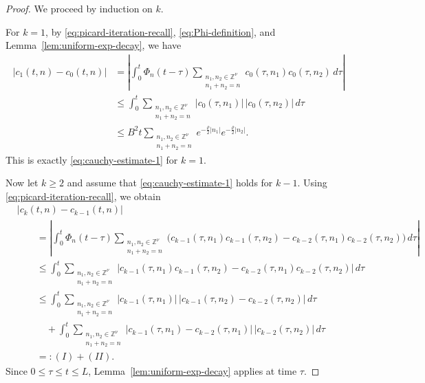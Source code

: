 \documentclass[12pt,reqno,tbtags]{amsart}
\newcommand\1{\mathbbm{1}}
\begin{document}
\begin{proof}
We proceed by induction on $k$.

For $k=1$, by \eqref{eq:picard-iteration-recall}, \eqref{eq:Phi-definition}, and
Lemma~\ref{lem:uniform-exp-decay}, we have
\begin{align*}
|c_1(t,n)-c_0(t,n)|
&=
\left|
\int_0^t \Phi_n(t-\tau)
\sum_{\substack{n_1,n_2\in \mathbb{Z}^{\nu}\\ n_1+n_2=n}}
c_0(\tau,n_1)c_0(\tau,n_2)\,d\tau
\right| \\
&\leq
\int_0^t
\sum_{\substack{n_1,n_2\in \mathbb{Z}^{\nu}\\ n_1+n_2=n}}
|c_0(\tau,n_1)|\,|c_0(\tau,n_2)|\,d\tau \\
&\leq
B^2 t
\sum_{\substack{n_1,n_2\in \mathbb{Z}^{\nu}\\ n_1+n_2=n}}
e^{-\frac{\rho}{2}|n_1|}e^{-\frac{\rho}{2}|n_2|}.
\end{align*}
This is exactly \eqref{eq:cauchy-estimate-1} for $k=1$.

Now let $k\geq 2$ and assume that \eqref{eq:cauchy-estimate-1} holds for $k-1$.
Using \eqref{eq:picard-iteration-recall}, we obtain
\begin{align*}
&|c_k(t,n)-c_{k-1}(t,n)| \\
&\qquad=
\left|
\int_0^t \Phi_n(t-\tau)
\sum_{\substack{n_1,n_2\in \mathbb{Z}^{\nu}\\ n_1+n_2=n}}
\Big(
c_{k-1}(\tau,n_1)c_{k-1}(\tau,n_2)
-
c_{k-2}(\tau,n_1)c_{k-2}(\tau,n_2)
\Big)\,d\tau
\right| \\
&\qquad\leq
\int_0^t
\sum_{\substack{n_1,n_2\in \mathbb{Z}^{\nu}\\ n_1+n_2=n}}
\big|
c_{k-1}(\tau,n_1)c_{k-1}(\tau,n_2)
-
c_{k-2}(\tau,n_1)c_{k-2}(\tau,n_2)
\big|\,d\tau \\
&\qquad\leq
\int_0^t
\sum_{\substack{n_1,n_2\in \mathbb{Z}^{\nu}\\ n_1+n_2=n}}
|c_{k-1}(\tau,n_1)|\,|c_{k-1}(\tau,n_2)-c_{k-2}(\tau,n_2)|\,d\tau
\\
&\qquad\quad+
\int_0^t
\sum_{\substack{n_1,n_2\in \mathbb{Z}^{\nu}\\ n_1+n_2=n}}
|c_{k-1}(\tau,n_1)-c_{k-2}(\tau,n_1)|\,|c_{k-2}(\tau,n_2)|\,d\tau \\
&\qquad=: (I)+(II).
\end{align*}
Since $0\leq \tau\leq t\leq L$, Lemma~\ref{lem:uniform-exp-decay} applies at time
$\tau$.


\end{proof}
\end{document}
